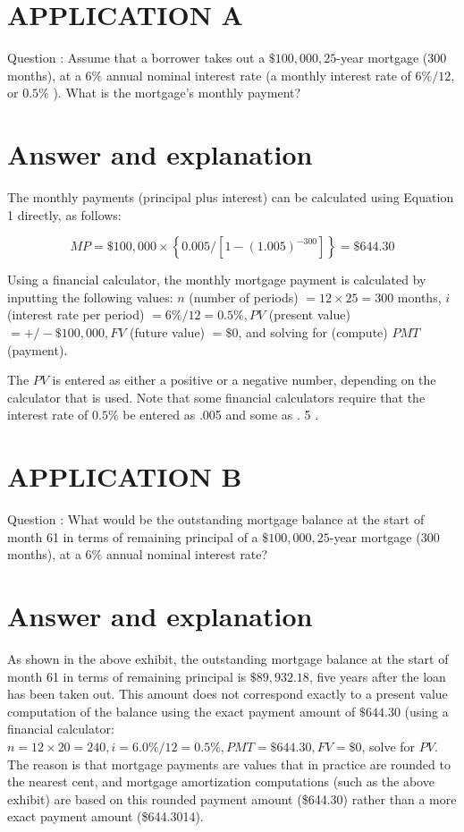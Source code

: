 \documentclass[11pt]{article}
\begin{document}
\section*{APPLICATION A}
Question : Assume that a borrower takes out a $\$ 100,000,25$-year mortgage (300 months), at a $6 \%$ annual nominal interest rate (a monthly interest rate of $6 \% / 12$, or $0.5 \%$ ). What is the mortgage's monthly payment?

\section*{Answer and explanation}
The monthly payments (principal plus interest) can be calculated using Equation 1 directly, as follows:

$$
M P=\$ 100,000 \times\left\{0.005 /\left[1-(1.005)^{-300}\right]\right\}=\$ 644.30
$$

Using a financial calculator, the monthly mortgage payment is calculated by inputting the following values: $n$ (number of periods) $=12 \times 25=300$ months, $i$ (interest rate per period) $=6 \% / 12=0.5 \%, P V$ (present value) $=+/-\$ 100,000, F V$ (future value) $=\$ 0$, and solving for (compute) $P M T$ (payment).

The $P V$ is entered as either a positive or a negative number, depending on the calculator that is used. Note that some financial calculators require that the interest rate of $0.5 \%$ be entered as .005 and some as . 5 .

\section*{APPLICATION B}
Question : What would be the outstanding mortgage balance at the start of month 61 in terms of remaining principal of a $\$ 100,000,25$-year mortgage (300 months), at a $6 \%$ annual nominal interest rate?

\section*{Answer and explanation}
As shown in the above exhibit, the outstanding mortgage balance at the start of month 61 in terms of remaining principal is $\$ 89,932.18$, five years after the loan has been taken out. This amount does not correspond exactly to a present value computation of the balance using the exact payment amount of $\$ 644.30$ (using a financial calculator: $n=12 \times 20=240, i=6.0 \% / 12=0.5 \%, P M T=\$ 644.30, F V=\$ 0$, solve for $P V$. The reason is that mortgage payments are values that in practice are rounded to the nearest cent, and mortgage amortization computations (such as the above exhibit) are based on this rounded payment amount (\$644.30) rather than a more exact payment amount (\$644.3014).
\end{document}
